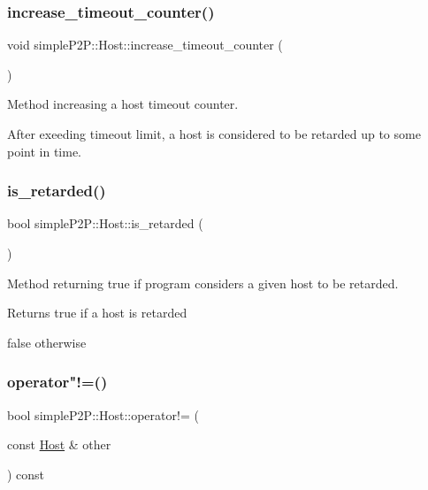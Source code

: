 \subsubsection{\texorpdfstring{increase\+\_\+timeout\+\_\+counter()}{increase\_timeout\_counter()}}
{\footnotesize\ttfamily void simple\+P2\+P\+::\+Host\+::increase\+\_\+timeout\+\_\+counter (\begin{DoxyParamCaption}{ }\end{DoxyParamCaption})}



Method increasing a host timeout counter. 

After exeeding timeout limit, a host is considered to be retarded up to some point in time. \mbox{\label{classsimpleP2P_1_1Host_ace84648960b75e127112069be905357c}} 
\subsubsection{\texorpdfstring{is\+\_\+retarded()}{is\_retarded()}}
{\footnotesize\ttfamily bool simple\+P2\+P\+::\+Host\+::is\+\_\+retarded (\begin{DoxyParamCaption}{ }\end{DoxyParamCaption})}



Method returning true if program considers a given host to be retarded. 

\begin{DoxyReturn}{Returns}
true if a host is retarded 

false otherwise 
\end{DoxyReturn}
\mbox{\label{classsimpleP2P_1_1Host_a13516e95bf59bb8dd6eea8940f8bb677}} 
\subsubsection{\texorpdfstring{operator"!=()}{operator!=()}}
{\footnotesize\ttfamily bool simple\+P2\+P\+::\+Host\+::operator!= (\begin{DoxyParamCaption}\item[{const \hyperlink{classsimpleP2P_1_1Host}{Host} \&}]{other }\end{DoxyParamCaption}) const}



